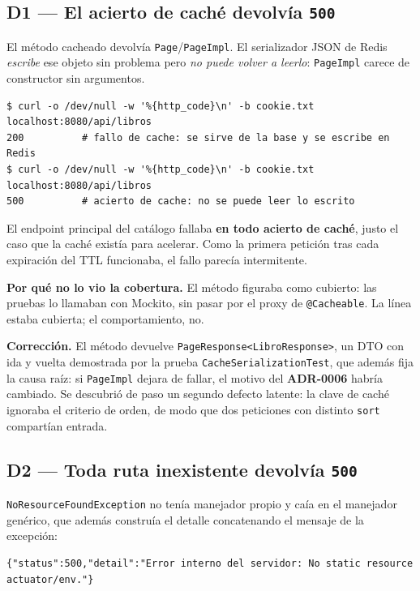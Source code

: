 \documentclass[11pt,a4paper]{article}
\newcommand{\adr}[1]{\textbf{ADR-#1}}
\begin{document}
\subsection{D1 --- El acierto de caché devolvía \texttt{500}}

El método cacheado devolvía \texttt{Page}/\texttt{PageImpl}. El serializador JSON
de Redis \emph{escribe} ese objeto sin problema pero \emph{no puede volver a
leerlo}: \texttt{PageImpl} carece de constructor sin argumentos.

\begin{lstlisting}
$ curl -o /dev/null -w '%{http_code}\n' -b cookie.txt localhost:8080/api/libros
200          # fallo de cache: se sirve de la base y se escribe en Redis
$ curl -o /dev/null -w '%{http_code}\n' -b cookie.txt localhost:8080/api/libros
500          # acierto de cache: no se puede leer lo escrito
\end{lstlisting}

El endpoint principal del catálogo fallaba \textbf{en todo acierto de caché},
justo el caso que la caché existía para acelerar. Como la primera petición tras
cada expiración del TTL funcionaba, el fallo parecía intermitente.

\textbf{Por qué no lo vio la cobertura.} El método figuraba como cubierto: las
pruebas lo llamaban con Mockito, sin pasar por el proxy de \texttt{@Cacheable}. La
línea estaba cubierta; el comportamiento, no.

\textbf{Corrección.} El método devuelve \texttt{PageResponse<LibroResponse>}, un
DTO con ida y vuelta demostrada por la prueba
\texttt{CacheSerializationTest}, que además fija la causa raíz: si
\texttt{PageImpl} dejara de fallar, el motivo del \adr{0006} habría cambiado. Se
descubrió de paso un segundo defecto latente: la clave de caché ignoraba el
criterio de orden, de modo que dos peticiones con distinto \texttt{sort}
compartían entrada.

\subsection{D2 --- Toda ruta inexistente devolvía \texttt{500}}

\texttt{NoResourceFoundException} no tenía manejador propio y caía en el
manejador genérico, que además construía el detalle concatenando el mensaje de la
excepción:

\begin{lstlisting}
{"status":500,"detail":"Error interno del servidor: No static resource actuator/env."}
\end{lstlisting}
\end{document}
